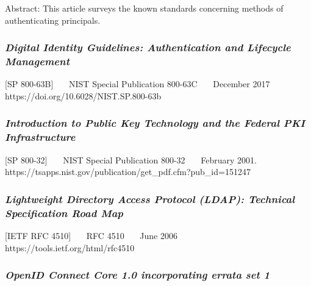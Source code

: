 Abstract: This article surveys the known standards concerning methods of
authenticating principals.

\hypertarget{digital-identity-guidelines-authentication-and-lifecycle-management}{%
\subsubsection{\texorpdfstring{\emph{Digital Identity Guidelines:
Authentication and Lifecycle
Management}}{Digital Identity Guidelines: Authentication and Lifecycle Management}}\label{digital-identity-guidelines-authentication-and-lifecycle-management}}

{[}SP 800-63B{]}~~~ NIST Special Publication 800-63C~~~ December 2017~~~
https://doi.org/10.6028/NIST.SP.800-63b~~~

\hypertarget{introduction-to-public-key-technology-and-the-federal-pki-infrastructure}{%
\subsubsection{\texorpdfstring{\emph{Introduction to Public Key Technology
and the Federal PKI
Infrastructure}}{Introduction to Public Key Technology and the Federal PKI Infrastructure}}\label{introduction-to-public-key-technology-and-the-federal-pki-infrastructure}}

{[}SP 800-32{]}~~~ NIST Special Publication 800-32~~~ February 2001.~~~
https://tsapps.nist.gov/publication/get\_pdf.cfm?pub\_id=151247~~~

\hypertarget{lightweight-directory-access-protocol-ldap-technical-specification-road-map}{%
\subsubsection{\texorpdfstring{\emph{Lightweight Directory Access Protocol
(LDAP): Technical Specification Road
Map}}{Lightweight Directory Access Protocol (LDAP): Technical Specification Road Map}}\label{lightweight-directory-access-protocol-ldap-technical-specification-road-map}}

{[}IETF RFC 4510{]}~~~ RFC 4510~~~ June 2006~~~
https://tools.ietf.org/html/rfc4510~~~

\hypertarget{openid-connect-core-1.0-incorporating-errata-set-1}{%
\subsubsection{\texorpdfstring{\emph{OpenID Connect Core 1.0 incorporating
errata set
1}}{OpenID Connect Core 1.0 incorporating errata set 1}}\label{openid-connect-core-1.0-incorporating-errata-set-1}}

